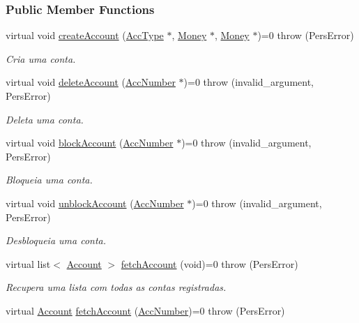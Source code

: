 \subsubsection*{Public Member Functions}
\begin{DoxyCompactItemize}
\item 
virtual void \hyperlink{classUserAccAdm_a23b313ce179890606746ab3a279bd833}{create\-Account} (\hyperlink{classUsrType}{Acc\-Type} $\ast$, \hyperlink{classMoney}{Money} $\ast$, \hyperlink{classMoney}{Money} $\ast$)=0  throw (\-Pers\-Error)
\begin{DoxyCompactList}\small\item\em Cria uma conta. \end{DoxyCompactList}\item 
virtual void \hyperlink{classUserAccAdm_a8257788e5e7d125b7482e490a6d71550}{delete\-Account} (\hyperlink{classAccNumber}{Acc\-Number} $\ast$)=0  throw (invalid\-\_\-argument, Pers\-Error)
\begin{DoxyCompactList}\small\item\em Deleta uma conta. \end{DoxyCompactList}\item 
virtual void \hyperlink{classUserAccAdm_ad9cdd01395ad7dd1b2c0887fe12b71b8}{block\-Account} (\hyperlink{classAccNumber}{Acc\-Number} $\ast$)=0  throw (invalid\-\_\-argument, Pers\-Error)
\begin{DoxyCompactList}\small\item\em Bloqueia uma conta. \end{DoxyCompactList}\item 
virtual void \hyperlink{classUserAccAdm_ae179b3e21f336b325452eb3c0981b0d9}{unblock\-Account} (\hyperlink{classAccNumber}{Acc\-Number} $\ast$)=0  throw (invalid\-\_\-argument, Pers\-Error)
\begin{DoxyCompactList}\small\item\em Desbloqueia uma conta. \end{DoxyCompactList}\item 
virtual list$<$ \hyperlink{classAccount}{Account} $>$ \hyperlink{classUserAccAdm_aa84b9df92ad9e11b1d9c71e9350efdc7}{fetch\-Account} (void)=0  throw (\-Pers\-Error)
\begin{DoxyCompactList}\small\item\em Recupera uma lista com todas as contas registradas. \end{DoxyCompactList}\item 
virtual \hyperlink{classAccount}{Account} \hyperlink{classUserAccAdm_a5957dcbf58d30b171a6ca0967dacf2d9}{fetch\-Account} (\hyperlink{classAccNumber}{Acc\-Number})=0  throw (\-Pers\-Error)

\end{DoxyCompactItemize}
